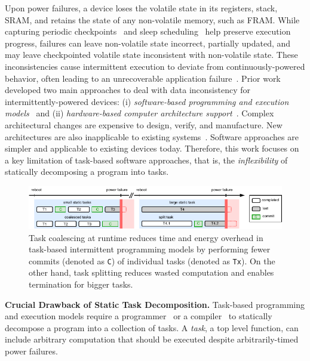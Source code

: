 Upon power failures, a device loses the volatile state in its registers, stack, SRAM, and retains the state of any non-volatile memory, such as FRAM. While capturing periodic checkpoints~\cite{mementos,quickrecall} and sleep scheduling~\cite{dewdrop,hibernus,hibernusplusplus} help preserve execution progress, failures can leave non-volatile state incorrect, partially updated, and may leave checkpointed volatile state inconsistent with non-volatile state. These inconsistencies cause intermittent execution to deviate from continuously-powered behavior, often leading to an unrecoverable application failure~\cite{dino,edb}. Prior work developed two main approaches to deal with data inconsistency for intermittently-powered devices: (i) \emph{software-based programming and execution models}~\cite{dino,ratchet,chain,alpaca} and (ii) \emph{hardware-based computer architecture support}~\cite{hicks_isca_2017,idetic,nvp}. Complex architectural changes are expensive to design, verify, and manufacture. New architectures are also inapplicable to existing systems~\cite{hicks_isca_2017,nvp}. Software approaches are simpler and applicable to existing devices today. Therefore, this work focuses on a key limitation of task-based software approaches, that is, the {\em inflexibility} of statically decomposing a program into tasks.
%
\begin{figure}
    \centering
    \includegraphics[width=\columnwidth]{figures/intro-figure-horiz.pdf}
    \caption{Task coalescing at runtime reduces time and energy overhead in task-based intermittent programming models by performing fewer commits (denoted as \texttt{C}) of individual tasks (denoted as \texttt{Tx}). On the other hand, task splitting reduces wasted computation and enables termination for bigger tasks.}
    \label{fig:coalesce}
\end{figure}
%
%
\textbf{Crucial Drawback of Static Task Decomposition.} Task-based programming and execution models require a programmer~\cite{alpaca,chain} or a compiler~\cite{baghsorkhi_cgo_2018} to statically decompose a program into a collection of tasks. A \emph{task}, a top level function, can include arbitrary computation that should be executed despite arbitrarily-timed power failures.

